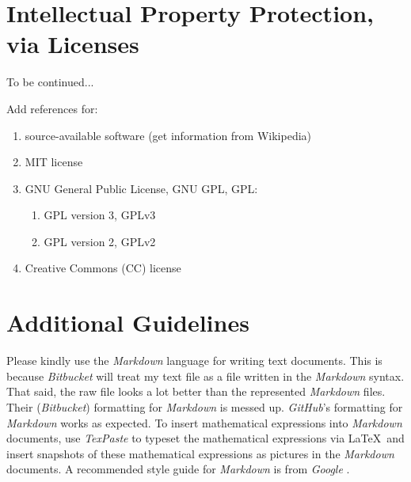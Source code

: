 \documentclass[letter,12pt]{article}
\begin{document}
\section{Intellectual Property Protection, via Licenses}
\label{sec:IntellectualPropertyProtectionViaLicenses}


{\Huge To be continued}...

Add references for: \vspace{-0.3cm}
\begin{enumerate} \itemsep -4pt
\item source-available software (get information from Wikipedia)
\item MIT license
\item GNU General Public License, GNU GPL, GPL: \vspace{-0.3cm}
	\begin{enumerate} \itemsep -2pt
	\item GPL version 3, GPLv3
	\item GPL version 2, GPLv2
	\end{enumerate}
\item Creative Commons (CC) license
\end{enumerate}













\section{Additional Guidelines}
\label{sec:AdditionalGuidelines}

Please kindly use the {\it Markdown} language for writing text documents. This is because {\it Bitbucket} will treat my text file as a file written in the {\it Markdown} syntax. That said, the raw file looks a lot better than the represented {\it Markdown} files. Their ({\it Bitbucket}) formatting for {\it Markdown} is messed up. {\it GitHub}'s formatting for {\it Markdown} works as expected. To insert mathematical expressions into {\it Markdown} documents, use {\it TexPaste} \cite{Nguyen2013} to typeset the mathematical expressions via \LaTeX\ and insert snapshots of these mathematical expressions as pictures in the {\it Markdown} documents. A recommended style guide for {\it Markdown} is from {\it Google} \cite{Turakulov2018}. \\
\end{document}
